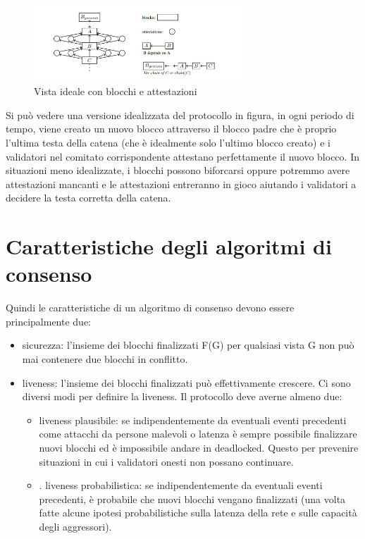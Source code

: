 \documentclass[a4paper,11pt]{report}
\begin{document}
\begin{figure}[htbp] 
\begin{center}
\includegraphics[width=8cm]{img/imgPoS.png} 
\end{center}
\caption{Vista ideale con blocchi e attestazioni}
\end{figure}

Si può vedere una versione idealizzata del protocollo in figura, in ogni periodo di tempo, viene creato un nuovo blocco attraverso il blocco padre che è proprio l'ultima testa della catena (che è idealmente solo l'ultimo blocco creato) e i validatori nel comitato corrispondente attestano perfettamente il nuovo blocco. In situazioni meno idealizzate, i blocchi possono biforcarsi oppure potremmo avere attestazioni mancanti e le attestazioni entreranno in gioco aiutando i validatori a decidere la testa corretta della catena.

\section{Caratteristiche degli algoritmi di consenso}
Quindi le caratteristiche di un algoritmo di consenso devono essere principalmente due:
\begin{itemize}
\item sicurezza: l'insieme dei blocchi finalizzati F(G) per qualsiasi vista G non può mai contenere due blocchi in conflitto.
\item liveness: l'insieme dei blocchi finalizzati può effettivamente crescere. Ci sono diversi modi per definire la liveness. Il protocollo deve averne almeno due:
\begin{itemize}
\item liveness plausibile: se indipendentemente da eventuali eventi precedenti come attacchi da persone malevoli o latenza è sempre possibile finalizzare nuovi blocchi ed è impossibile andare in deadlocked. Questo per prevenire situazioni in cui i validatori onesti non possano continuare.
\item. liveness probabilistica: se indipendentemente da eventuali eventi precedenti, è probabile che nuovi blocchi vengano finalizzati (una volta fatte alcune ipotesi probabilistiche sulla latenza della rete e sulle capacità degli aggressori).
\end{itemize}
\end{itemize}
\end{document}
